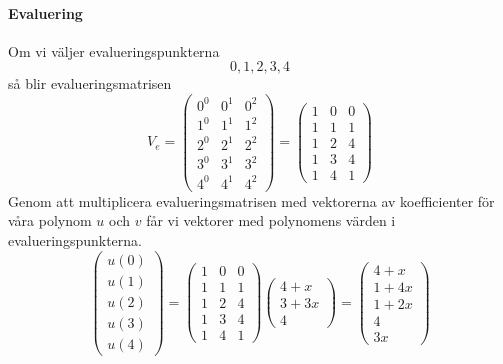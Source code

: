 \paragraph{Evaluering}
Om vi väljer evalueringspunkterna
\begin{equation*}
  0, 1, 2, 3, 4
\end{equation*}
så blir evalueringsmatrisen
\begin{equation*}
  V_e = \begin{pmatrix}
    0^0 & 0^1 & 0^2 \\
    1^0 & 1^1 & 1^2 \\
    2^0 & 2^1 & 2^2 \\
    3^0 & 3^1 & 3^2 \\
    4^0 & 4^1 & 4^2
  \end{pmatrix} =
  \begin{pmatrix}
    1 & 0 & 0 \\
    1 & 1 & 1 \\
    1 & 2 & 4 \\
    1 & 3 & 4 \\
    1 & 4 & 1
  \end{pmatrix}
\end{equation*}
Genom att multiplicera evalueringsmatrisen med vektorerna av koefficienter för
våra polynom $u$ och $v$ får vi vektorer med polynomens värden i
evalueringspunkterna.
\begin{equation*}
  \begin{pmatrix}
    u(0) \\
    u(1) \\
    u(2) \\
    u(3) \\
    u(4)
  \end{pmatrix} =
  \begin{pmatrix}
    1 & 0 & 0 \\
    1 & 1 & 1 \\
    1 & 2 & 4 \\
    1 & 3 & 4 \\
    1 & 4 & 1
  \end{pmatrix}
  \begin{pmatrix}
    4 + x \\
    3 + 3x \\
    4
  \end{pmatrix} =
  \begin{pmatrix}
    4 + x \\
    1 + 4x \\
    1 + 2x \\
    4 \\
    3x
  \end{pmatrix}
\end{equation*}
